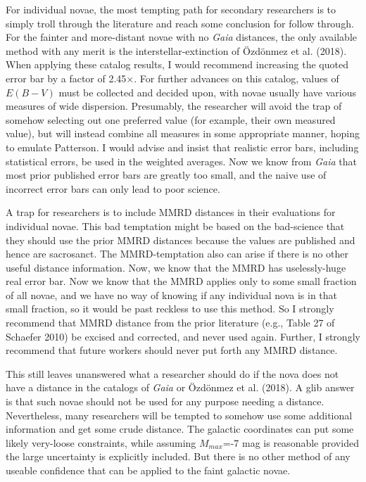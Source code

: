 \documentclass[a4paper,fleqn,usenatbib]{mnras}
\begin{document}
For individual novae, the most tempting path for secondary researchers is to simply troll through the literature and reach some conclusion for follow through.  For the fainter and more-distant novae with no {\it Gaia} distances, the only available method with any merit is the interstellar-extinction of \"{O}zd\"{o}nmez et al. (2018).  When applying these catalog results, I would recommend increasing the quoted error bar by a factor of 2.45$\times$.  For further advances on this catalog, values of $E(B-V)$ must be collected and decided upon, with novae usually have various measures of wide dispersion.  Presumably, the researcher will avoid the trap of somehow selecting out one preferred value (for example, their own measured value), but will instead combine all measures in some appropriate manner, hoping to emulate Patterson.  I would advise and insist that realistic error bars, including statistical errors, be used in the weighted averages.  Now we know from {\it Gaia} that most prior published error bars are greatly too small, and the naive use of incorrect error bars can only lead to poor science.

A trap for researchers is to include MMRD distances in their evaluations for individual novae.  This bad temptation might be based on the bad-science that they should use the prior MMRD distances because the values are published and hence are sacrosanct.  The MMRD-temptation also can arise if there is no other useful distance information.  Now, we know that the MMRD has uselessly-huge real error bar.  Now we know that the MMRD applies only to some small fraction of all novae, and we have no way of knowing if any individual nova is in that small fraction, so it would be past reckless to use this method.  So I strongly recommend that MMRD distance from the prior literature (e.g., Table 27 of Schaefer 2010) be excised and corrected, and never used again.  Further, I strongly recommend that future workers should never put forth any MMRD distance.

This still leaves unanswered what a researcher should do if the nova does not have a distance in the catalogs of {\it Gaia} or \"{O}zd\"{o}nmez et al. (2018).  A glib answer is that such novae should not be used for any purpose needing a distance.  Nevertheless, many researchers will be tempted to somehow use some additional information and get some crude distance.  The galactic coordinates can put some likely very-loose constraints, while assuming $M_{max}$=-7 mag is reasonable provided the large uncertainty is explicitly included.  But there is no other method of any useable confidence that can be applied to the faint galactic novae.
\end{document}
